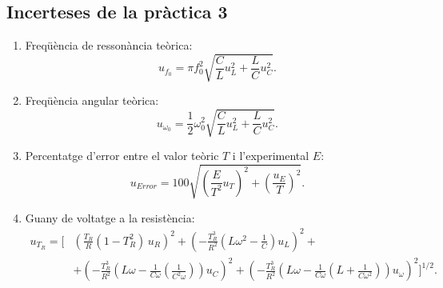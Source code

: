 \documentclass[a4paper,10.5pt]{report}
\begin{document}
\begin{appendices}
\subsection{Incerteses de la pràctica 3}
\begin{enumerate}
	\item Freqüència de ressonància teòrica: \begin{equation}
		u_{f_0}=\pi f_0^2\sqrt{\frac{C}{L}u_L^2+\frac{L}{C}u_C^2}.
	\end{equation}
	\item Freqüència angular teòrica: \begin{equation}
		u_{\omega_0}=\frac{1}{2}\omega_0^2\sqrt{\frac{C}{L}u_L^2+\frac{L}{C}u_C^2}.
	\end{equation}
	\item Percentatge d'error entre el valor teòric $T$ i l'experimental $E$: \begin{equation}
		u_{Error}=100\sqrt{\left(\frac{E}{T^2}u_T\right)^2+\left(\frac{u_E}{T}\right)^2}.
	\end{equation}
	\item Guany de voltatge a la resistència: \begin{equation}
		\begin{aligned}
			u_{T_R} = \bigg[ &
			\left( \frac{T_R}{R} (1 - T_R^2) \, u_R \right)^2 + 
			\left( -\frac{T_R^3}{R^2} \left( L\omega^2 - \frac{1}{C} \right) u_L \right)^2 + \\
			& +\left( -\frac{T_R^3}{R^2} \left( L\omega - \frac{1}{C\omega} \left( \frac{1}{C^2 \omega}\right) \right) u_C \right)^2 + 
			\left( -\frac{T_R^3}{R^2} \left( L\omega - \frac{1}{C\omega} \left( L + \frac{1}{C\omega^2} \right) \right) u_{\omega} \right)^2 
			\bigg]^{1/2}.
		\end{aligned}
	\end{equation}
\end{enumerate}

\end{appendices}
\end{document}
